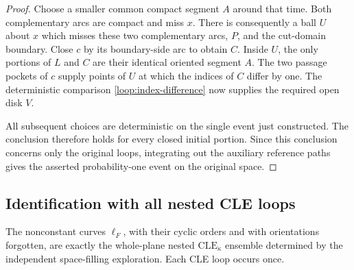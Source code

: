 \begin{proof}
Choose a smaller common compact segment $A$ around that time.  Both
complementary arcs are compact and miss $x$.  There is consequently a
ball $U$ about $x$ which misses these two complementary arcs, $P$, and
the cut-domain boundary.  Close $c$ by its boundary-side arc to obtain
$C$.  Inside $U$, the only portions of $L$ and $C$ are their identical
oriented segment $A$.  The two passage pockets of $c$ supply points
of $U$ at which the indices of $C$ differ by one.  The deterministic
comparison \eqref{loop:index-difference} now supplies the required
open disk $V$.

All subsequent choices are deterministic on the single event just
constructed.  The conclusion therefore holds for every closed initial
portion.  Since this conclusion concerns only the original loops,
integrating out the auxiliary reference paths gives the asserted
probability-one event on the original space.
\end{proof}

\subsection{Identification with all nested CLE loops}

\begin{theorem}\label{loop:readout}
The nonconstant curves $\ell_F$, with their cyclic orders and with
orientations forgotten, are exactly the whole-plane nested
$\mathrm{CLE}_{\kappa}$ ensemble determined by the independent
space-filling exploration.  Each CLE loop occurs once.
\end{theorem}

